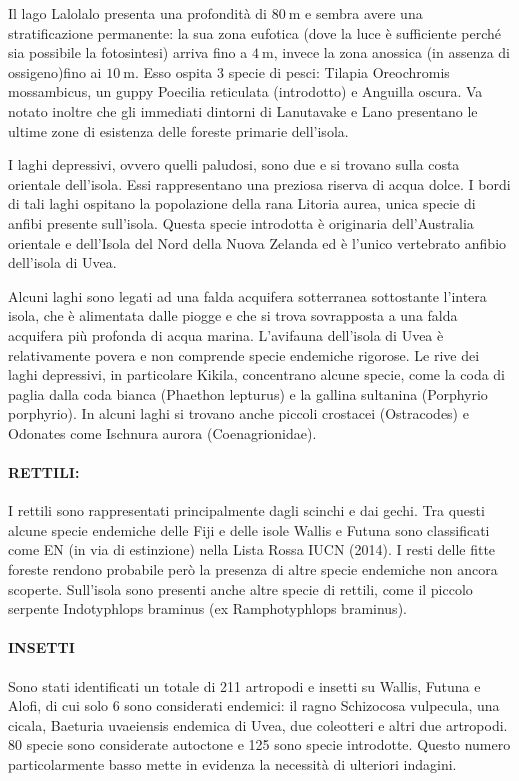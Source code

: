 \documentclass[fleqn,11pt]{SelfArx} %
\begin{document}
Il lago Lalolalo presenta una profondità di \(\SI{80}{\m}\) e sembra avere una stratificazione permanente: la sua zona eufotica (dove la luce è sufficiente perché sia possibile la fotosintesi) arriva fino a \(\SI{4}{\m}\), invece la zona anossica (in assenza di ossigeno)fino ai \(\SI{10}{\m}\).
Esso ospita 3 specie di pesci: Tilapia Oreochromis mossambicus, un guppy Poecilia reticulata (introdotto) e Anguilla oscura.
Va notato inoltre che gli immediati dintorni di Lanutavake e Lano presentano le ultime zone di esistenza delle foreste primarie dell'isola.

I laghi depressivi, ovvero quelli paludosi, sono due e si trovano sulla costa orientale dell'isola.
Essi rappresentano una preziosa riserva di acqua dolce.
I bordi di tali laghi  ospitano la popolazione della rana Litoria aurea, unica specie di anfibi presente sull'isola. 
Questa specie introdotta è originaria dell'Australia orientale e dell'Isola del Nord della Nuova Zelanda ed è l'unico vertebrato anfibio dell'isola di Uvea.

Alcuni laghi sono legati ad una falda acquifera sotterranea sottostante l'intera isola, che è alimentata dalle piogge e che si trova sovrapposta a una falda acquifera più profonda di acqua marina.
L'avifauna dell'isola di Uvea è relativamente povera e non comprende specie endemiche rigorose. 
Le rive dei laghi depressivi, in particolare Kikila, concentrano alcune specie, come la coda di paglia dalla coda bianca (Phaethon lepturus) e la gallina sultanina (Porphyrio porphyrio).
In alcuni laghi si trovano anche piccoli crostacei (Ostracodes) e Odonates come Ischnura aurora (Coenagrionidae).

\paragraph{RETTILI:}
I rettili sono rappresentati principalmente dagli scinchi e dai gechi.
Tra questi alcune specie endemiche delle Fiji e delle isole Wallis e Futuna sono classificati come EN (in via di estinzione) nella Lista Rossa IUCN (2014).
I resti delle fitte foreste rendono probabile però la presenza di altre specie endemiche non ancora scoperte.
Sull'isola sono presenti anche altre specie di rettili, come il piccolo serpente Indotyphlops braminus (ex Ramphotyphlops braminus).

\paragraph{INSETTI}
Sono stati identificati un totale di 211 artropodi e insetti su Wallis, Futuna e Alofi, di cui solo 6 sono considerati endemici: il ragno Schizocosa vulpecula, una cicala, Baeturia uvaeiensis endemica di Uvea, due coleotteri e altri due artropodi.
80 specie sono considerate autoctone e 125 sono specie introdotte.
Questo numero particolarmente basso mette in evidenza la necessità di ulteriori indagini.
\end{document}
